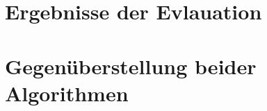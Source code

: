 \section{Ergebnisse der Evlauation}
\label{sec:anforderunsevaluierung}

\section{Gegenüberstellung beider Algorithmen}
\label{sec:gegenueberstellung}
